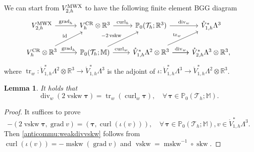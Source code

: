 \documentclass[10pt]{amsart}
\numberwithin{equation}{section}
\newtheorem{lemma}[theorem]{Lemma}
\newcommand{\curl}{\operatorname{curl}}
\renewcommand{\div}{\operatorname{div}}
\newcommand{\grad}{\operatorname{grad}}
\newcommand{\tr}{\operatorname{tr}}
\newcommand{\skw}{\operatorname{skw}}
\newcommand{\mskw}{\operatorname{mskw}}
\newcommand{\vskw}{\operatorname{vskw}}
\begin{document}
We can start from $V_{2,h}^{\rm MWX}$ to have the following finite element BGG diagram
\begin{equation}\label{discBGG3dHess:MXW2}
\begin{tikzcd}
V_{2,h}^{\rm MWX}
\arrow{r}{\grad_h}
&
V_{h}^{\rm CR}\otimes\mathbb R^3
 \arrow{r}{\curl_h}
 &
\mathbb P_0(\mathcal T_h;\mathbb R^3)
 \arrow{r}{\div_w}
 & \mathring{V}_{1,h}^{*}\Lambda^{3}
 \\
V_{h}^{\rm CR}\otimes\mathbb R^3
 \arrow[ur,swap,"{\rm id}"'] 
 \arrow{r}{\grad_h}
 & 
\mathbb P_0(\mathcal T_h; \mathbb M)
 \arrow[ur,"- 2\vskw"] \arrow{r}{\curl_w}
 & 
\mathring{V}_{1,h}^{*}\Lambda^{2}\otimes\mathbb R^3
 \arrow[ur,"\tr_w"] \arrow{r}{\div_w} \arrow[r] 
 &\mathring{V}_{2,h}^{*}\Lambda^3\otimes\mathbb R^3,
\end{tikzcd}
\end{equation}
where $\tr_w: \mathring{V}_{1,h}^{*}\Lambda^{2}\otimes\mathbb R^3\to \mathring{V}_{1,h}^{*}\Lambda^{3}$ is the adjoint of $\iota: \mathring{V}_{1,h}^{*}\Lambda^{3}\to\mathring{V}_{1,h}^{*}\Lambda^{2}\otimes\mathbb R^3$.

\begin{lemma}
It holds that
\begin{equation}\label{anticommu:weakdivvskw}
\div_w(2\vskw\boldsymbol{\tau}) = \tr_w(\curl_w\boldsymbol{\tau}),\quad\forall\,\boldsymbol{\tau}\in\mathbb P_0(\mathcal T_h; \mathbb M).
\end{equation}
\end{lemma}
\begin{proof}
It suffices to prove
\begin{equation*}
-(2\vskw\boldsymbol{\tau},\grad v) = (\boldsymbol{\tau}, \curl(\iota(v))),\quad\forall\,\boldsymbol{\tau}\in\mathbb P_0(\mathcal T_h; \mathbb M), v\in\mathring{V}_{1,h}^{*}\Lambda^{3}.
\end{equation*}
Then \eqref{anticommu:weakdivvskw} follows from $\curl(\iota(v))=-\mskw(\grad v)$ and $\vskw = \mskw^{-1}\circ \skw$.
\end{proof}
\end{document}
